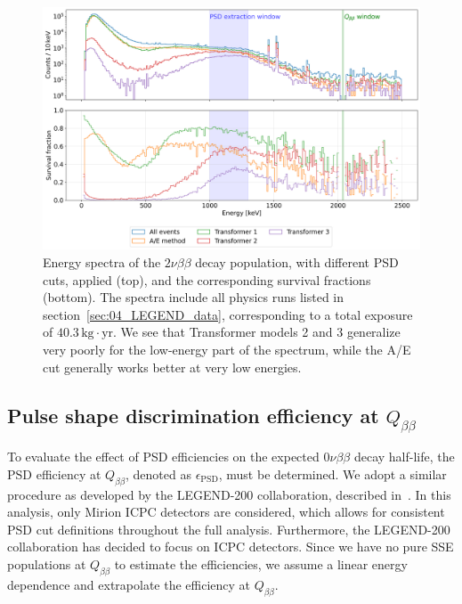 \begin{figure}[t]
    \centering
    \includegraphics[width=\linewidth]{figures/05_PSD/SSE_cuts_2vbb.png}
    \caption{Energy spectra of the $2 \nu \beta \beta$ decay population, with different PSD cuts, applied (top), and the corresponding survival fractions (bottom). The spectra include all physics runs listed in section~\ref{sec:04_LEGEND_data}, corresponding to a total exposure of $40.3\, \mathrm{kg} \cdot \mathrm{yr}$. We see that Transformer models 2 and 3 generalize very poorly for the low-energy part of the spectrum, while the A/E cut generally works better at very low energies. }
\label{fig:SSE_cuts_2vbb}
\end{figure}



\subsection{Pulse shape discrimination efficiency at \texorpdfstring{$Q_{\beta \beta}$}{}}
To evaluate the effect of PSD efficiencies on the expected $0 \nu \beta \beta$ decay half-life, the PSD efficiency at $Q_{\beta \beta}$, denoted as $\epsilon_{\mathrm{PSD}}$, must be determined. We adopt a similar procedure as developed by the LEGEND-200 collaboration, described in~\cite{lnote_24013}. 
In this analysis, only Mirion ICPC detectors are considered, which allows for consistent PSD cut definitions throughout the full analysis. Furthermore, the LEGEND-200 collaboration has decided to focus on ICPC detectors. Since we have no pure SSE populations at $Q_{\beta \beta}$ to estimate the efficiencies, we assume a linear energy dependence and extrapolate the efficiency at $Q_{\beta \beta}$. 

